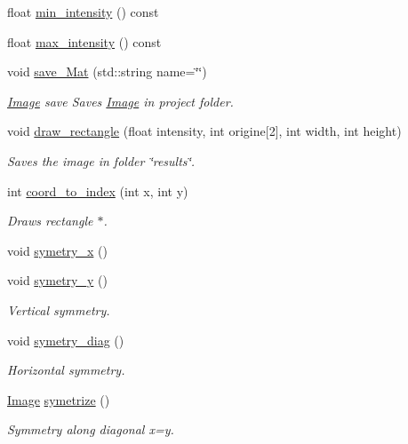 \begin{DoxyCompactItemize}
float \hyperlink{class_image_a95722e3f24951df7cc6a88e152da9e2d}{min\+\_\+intensity} () const
\item 
float \hyperlink{class_image_a71cc86b70dfe64d9e49e578ec9cc35c4}{max\+\_\+intensity} () const
\item 
void \hyperlink{class_image_aab9a29c0674f48d19f351f1778650bcc}{save\+\_\+\+Mat} (std\+::string name=\char`\"{}\char`\"{})
\begin{DoxyCompactList}\small\item\em \hyperlink{class_image}{Image} save Saves \hyperlink{class_image}{Image} in project folder. \end{DoxyCompactList}\item 
void \hyperlink{class_image_a2e32215c63cf4f3c6e981ad9cdda3a37}{draw\+\_\+rectangle} (float intensity, int origine\mbox{[}2\mbox{]}, int width, int height)
\begin{DoxyCompactList}\small\item\em Saves the image in folder \char`\"{}results\char`\"{}. \end{DoxyCompactList}\item 
int \hyperlink{class_image_ad74c9687964b22f9fe9d01a75218802c}{coord\+\_\+to\+\_\+index} (int x, int y)
\begin{DoxyCompactList}\small\item\em Draws rectangle $\ast$. \end{DoxyCompactList}\item 
void \hyperlink{class_image_a1e5dc2ce667f652f79dfd424601746e6}{symetry\+\_\+x} ()
\item 
void \hyperlink{class_image_ae2c7363e2c5737769fdc72a32339ea94}{symetry\+\_\+y} ()
\begin{DoxyCompactList}\small\item\em Vertical symmetry. \end{DoxyCompactList}\item 
void \hyperlink{class_image_a2ce3ef5944ba2f2f150750306f51e700}{symetry\+\_\+diag} ()
\begin{DoxyCompactList}\small\item\em Horizontal symmetry. \end{DoxyCompactList}\item 
\hyperlink{class_image}{Image} \hyperlink{class_image_ae2457c01fba86c48ffd25a932e8a835a}{symetrize} ()
\begin{DoxyCompactList}\small\item\em Symmetry along diagonal x=y. \end{DoxyCompactList}\item 

\end{DoxyCompactItemize}

